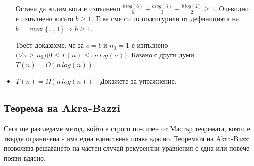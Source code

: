 \begin{solution}
\begin{itemize}
\begin{indstep}
			Остана да видим кога е изпълнено $\frac{b\,log(6)}6+\frac{b\,log(3)}3+\frac{b\,log(2)}2\ge1$. Очевидно е изпълнено когато $b\ge1$. Това сме си го подсигурили от дефиницията на $b=\max\{\dots,1\}\Rightarrow b\ge1$.
		\end{indstep}
		
		Тоест доказахме, че за $c=b$ и $n_0=1$ е изпълнено $\big(\forall n\ge n_0\big)\big(0\le T(n)\le cn\,log(n)\big)$. Казано с други думи $T(n)=O(n\,log(n))$.
		
		\vspace{0.35cm}
		\item $T(n)=\Omega(n\,log(n))$ - Докажете за упражнение.
	\end{itemize}
	
	
\end{solution}\vspace{0.25cm}


\subsection{Теорема на Akra-Bazzi}

Сега ще разгледаме метод, който е строго по-силен от Мастър теоремата, която е твърде ограничена - има една единствена поява вдясно. Теоремата на Akra-Bazzi позволява решаването на частен случай рекурентни уравнения с една или повече появи вдясно.%

